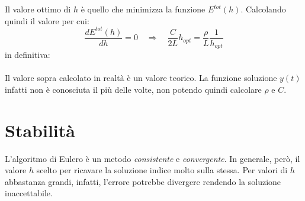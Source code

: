 Il valore ottimo di $h$ è quello che minimizza la funzione $E^{tot}(h)$. Calcolando quindi il valore per cui:
\begin{equation*}
	\dfrac{dE^{tot}(h)}{dh} = 0 \quad \Rightarrow \quad \dfrac{C}{2L}h_{opt} = \dfrac{\rho}{L}\dfrac{1}{h_{opt}}
\end{equation*}
in definitiva:
\vspace{0.5cm}
\\
\vspace{0.5cm}
\\
Il valore sopra calcolato in realtà è un valore teorico. La funzione soluzione $y(t)$ infatti non è conosciuta il più delle volte, non potendo quindi calcolare $\rho$ e $C$.


\section{Stabilità}
L'algoritmo di Eulero è un metodo \textit{consistente} e \textit{convergente}. In generale, però, il valore $h$ scelto per ricavare la soluzione indice molto sulla stessa. Per valori di $h$ abbastanza grandi, infatti, l'errore potrebbe divergere rendendo la soluzione inaccettabile.

